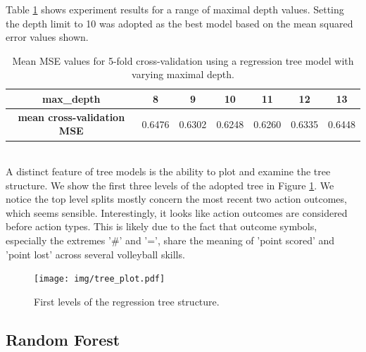 \documentclass{sfuthesis}
\begin{document}
	Table \ref{tab:tree-mse} shows experiment results for a range of maximal depth values. Setting the depth limit to 10 was adopted as the best model based on the mean squared error values shown.\\
	\begin{table}[ht]
		\centering
		\begin{tabular}{c|cccccc}
			\textbf{max\_depth}                & 8      & 9      & 10     & 11     & 12     & 13     \\ \hline
			\textbf{mean cross-validation MSE} & 0.6476 & 0.6302 & 0.6248 & 0.6260 & 0.6335 & 0.6448
		\end{tabular}
		\caption{Mean MSE values for 5-fold cross-validation using a regression tree model with varying maximal depth.}
		\label{tab:tree-mse}
	\end{table}
	\\A distinct feature of tree models is the ability to plot and examine the tree structure. We show the first three levels of the adopted tree in Figure \ref{fig:tree-plot}. We notice the top level splits mostly concern the most recent two action outcomes, which seems sensible. Interestingly, it looks like action outcomes are considered before action types. This is likely due to the fact that outcome symbols, especially the extremes '\#' and '=', share the meaning of 'point scored' and 'point lost' across several volleyball skills.
	\begin{figure}[ht]
		\hspace{-3cm}
		\texttt{[image: img/tree\_plot.pdf]}
		\caption{First levels of the regression tree structure.}
		\label{fig:tree-plot}
	\end{figure}
	
	\subsection{Random Forest}
	
\end{document}
